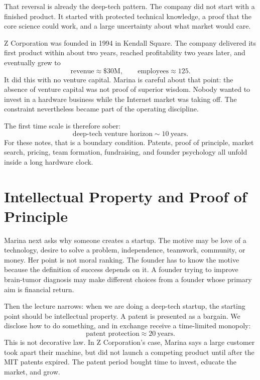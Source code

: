 That reversal is already the deep-tech pattern. The company did not start with a finished product. It started with protected technical knowledge, a proof that the core science could work, and a large uncertainty about what market would care.

Z Corporation was founded in 1994 in Kendall Square. The company delivered its first product within about two years, reached profitability two years later, and eventually grew to
\begin{equation}
\text{revenue}\approx \$30\text{M},
\qquad
\text{employees}\approx 125.
\end{equation}
It did this with no venture capital. Marina is careful about that point: the absence of venture capital was not proof of superior wisdom. Nobody wanted to invest in a hardware business while the Internet market was taking off. The constraint nevertheless became part of the operating discipline.

The first time scale is therefore sober:
\begin{equation}
\text{deep-tech venture horizon}\sim 10\ \text{years}.
\end{equation}
For these notes, that is a boundary condition. Patents, proof of principle, market search, pricing, team formation, fundraising, and founder psychology all unfold inside a long hardware clock.

\section{Intellectual Property and Proof of Principle}

Marina next asks why someone creates a startup. The motive may be love of a technology, desire to solve a problem, independence, teamwork, community, or money. Her point is not moral ranking. The founder has to know the motive because the definition of success depends on it. A founder trying to improve brain-tumor diagnosis may make different choices from a founder whose primary aim is financial return.

Then the lecture narrows: when we are doing a deep-tech startup, the starting point should be intellectual property. A patent is presented as a bargain. We disclose how to do something, and in exchange receive a time-limited monopoly:
\begin{equation}
\text{patent protection}\approx 20\ \text{years}.
\end{equation}
This is not decorative law. In Z Corporation's case, Marina says a large customer took apart their machine, but did not launch a competing product until after the MIT patents expired. The patent period bought time to invest, educate the market, and grow.

